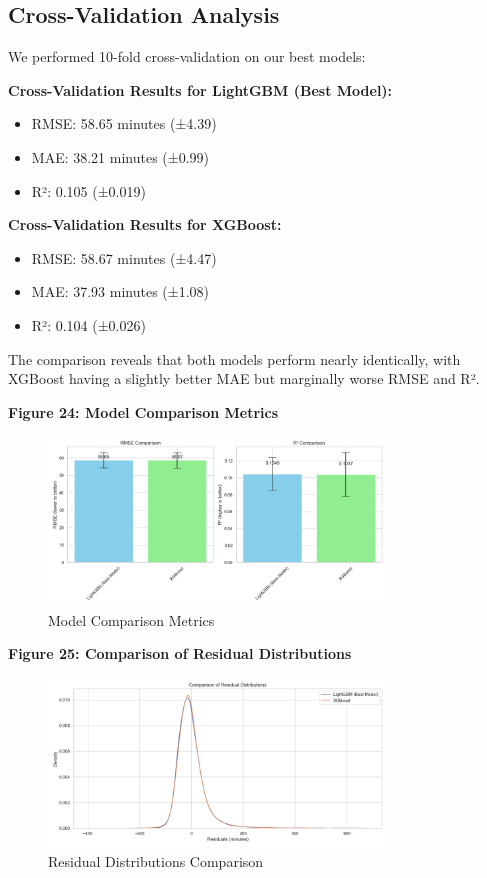 \documentclass[12pt,letterpaper]{article}
\begin{document}
\subsection{Cross-Validation Analysis}

We performed 10-fold cross-validation on our best models:

\textbf{Cross-Validation Results for LightGBM (Best Model):}
\begin{itemize}
    \item RMSE: 58.65 minutes (±4.39)
    \item MAE: 38.21 minutes (±0.99)
    \item R²: 0.105 (±0.019)
\end{itemize}

\textbf{Cross-Validation Results for XGBoost:}
\begin{itemize}
    \item RMSE: 58.67 minutes (±4.47)
    \item MAE: 37.93 minutes (±1.08)
    \item R²: 0.104 (±0.026)
\end{itemize}

The comparison reveals that both models perform nearly identically, with XGBoost having a slightly better MAE but marginally worse RMSE and R².

\textbf{Figure 24: Model Comparison Metrics}

\begin{figure}[H]
    \centering
    \includegraphics[width=0.8\textwidth]{duration_prediction/visualizations/model_comparison_metrics.png}
    \caption{Model Comparison Metrics}
\end{figure}

\textbf{Figure 25: Comparison of Residual Distributions}

\begin{figure}[H]
    \centering
    \includegraphics[width=0.8\textwidth]{duration_prediction/visualizations/model_comparison_residuals.png}
    \caption{Residual Distributions Comparison}
\end{figure}
\end{document}
